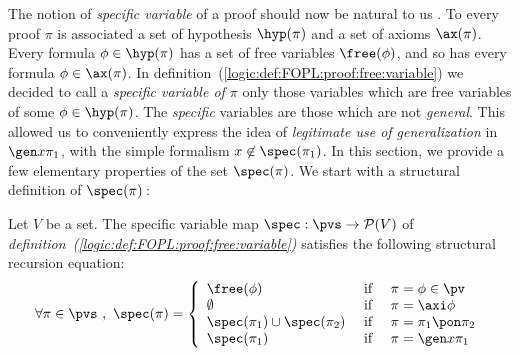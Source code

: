 The notion of {\em specific variable} of a proof should now be
natural to us . To every proof $\pi$ is associated a set of
hypothesis $\hyp(\pi)$ and a set of axioms $\ax(\pi)$. Every formula
$\phi\in\hyp(\pi)$ has a set of free variables $\free(\phi)$, and so
has every formula $\phi\in\ax(\pi)$. In
definition~(\ref{logic:def:FOPL:proof:free:variable}) we decided to
call a {\em specific variable of $\pi$} only those variables which
are free variables of some $\phi\in\hyp(\pi)$. The {\em specific}
variables are those which are not {\em general}. This allowed us to
conveniently express the idea of {\em legitimate use of
generalization} in $\gen x\pi_{1}$, with the simple formalism
$x\not\in\spec(\pi_{1})$. In this section, we provide a few
elementary properties of the set $\spec(\pi)$. We start with a
structural definition of $\spec(\pi)$\,:
\begin{prop}\label{logic:prop:FUAP:freevar:recursive:def}
Let $V$ be a set. The specific variable map $\spec:\pvs\to {\cal
P}(V)$ of {\em
definition~(\ref{logic:def:FOPL:proof:free:variable})} satisfies the
following structural recursion equation:
 \[
    \forall\pi\in\pvs\ ,\ \spec(\pi)=\left\{
                    \begin{array}{lcl}
                    \free(\phi)&\mbox{\ if\ }&\pi=\phi\in\pv\\
                    \emptyset&\mbox{\ if\ }&\pi=\axi\phi\\
                    \spec(\pi_{1})\cup\spec(\pi_{2}) &\mbox{\ if\ }&\pi=\pi_{1}\pon\pi_{2}\\
                    \spec(\pi_{1})&\mbox{\ if\ }&\pi=\gen x\pi_{1}
                    \end{array}\right.
    \]
\end{prop}
